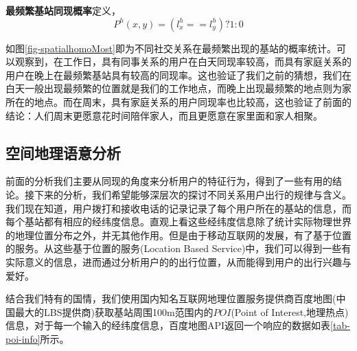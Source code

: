 \begin{definition}
    \label{spatial-homo-concept}
    \textbf{最频繁基站同现概率}定义，
    \begin{equation}
        P^{h}(x,y) = (l_x^h == l_y^h)? 1:0 
    \end{equation}
\end{definition}

如图\ref{fig-spatialhomoMost}即为不同社交关系在最频繁出现的基站的概率统计。可以观察到，在工作日，具有同事关系的用户在白天同现率较高，而具有家庭关系的用户在晚上在最频繁基站具有较高的同现率。这也验证了我们之前的猜想，我们在白天一般出现最频繁的位置就是我们的工作地点，而晚上出现最频繁的地点则为家所在的地点。而在周末，具有家庭关系的用户同现率也比较高，这也验证了前面的结论：人们周末更愿意花时间陪伴家人，而且更愿意在家里面和家人相聚。



\subsection{空间地理语意分析}

前面的分析我们主要从同现的角度来分析用户的特征行为，得到了一些有用的结论。接下来的分析，我们希望能够深层次的探讨不同关系用户出行的规律与含义。我们现在知道，用户拨打和接收电话的记录记录了每个用户所在的基站的信息，而每个基站都有相应的经纬度信息。直观上看这些经纬度信息除了统计实际物理世界的地理位置分布之外，并无其他作用。但是由于移动互联网的发展，有了基于位置的服务。从这些基于位置的服务(Location Based Service)中，我们可以得到一些有实际意义的信息，进而通过分析用户的的出行位置，从而能得到用户的出行兴趣与爱好。

结合我们特有的国情，我们使用国内知名互联网地理位置服务提供商百度地图(中国最大的LBS提供商)获取基站周围100m范围内的$POI$(Point of Interest,地理热点)信息，对于每一个输入的经纬度信息，百度地图API返回一个响应的数据如表\ref{tab-poi-info}所示。

